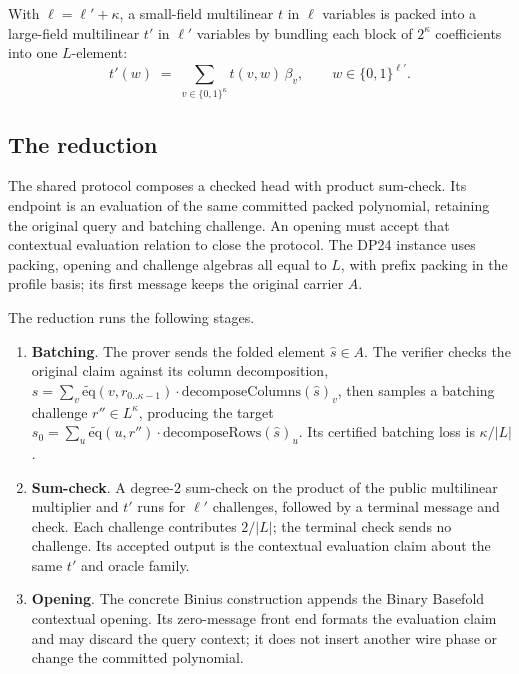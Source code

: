\begin{definition}
  \leanok
  \label{def:pack_mle}
  With $\ell = \ell' + \kappa$, a small-field multilinear $t$ in $\ell$ variables is packed into a
  large-field multilinear $t'$ in $\ell'$ variables by bundling each block of $2^\kappa$ coefficients
  into one $L$-element:
  \[
    t'(w) \;=\; \sum_{v \in \{0,1\}^\kappa} t(v, w)\,\beta_v, \qquad w \in \{0,1\}^{\ell'}.
  \]
\end{definition}

\subsection{The reduction}

The shared protocol composes a checked head with product sum-check. Its endpoint is an evaluation
of the same committed packed polynomial, retaining the original query and batching challenge.
An opening must accept that contextual evaluation relation to close the protocol. The DP24
instance uses packing, opening and challenge algebras all equal to $L$, with prefix packing in
the profile basis; its first message keeps the original carrier $A$.

\begin{definition}
  \label{def:ring_switching_stages}
  \leanok
  The reduction runs the following stages.
\begin{enumerate}
  \item \textbf{Batching}. The prover sends the folded element
    $\hat s \in A$. The verifier checks the original claim against its column decomposition,
    $s = \sum_v \tilde{\mathrm{eq}}(v, r_{0..\kappa-1})\cdot
    \mathrm{decomposeColumns}(\hat s)_v$, then samples a batching challenge $r'' \in L^\kappa$,
    producing the target $s_0 = \sum_u \tilde{\mathrm{eq}}(u, r'')\cdot
    \mathrm{decomposeRows}(\hat s)_u$. Its certified batching loss is
    $\kappa/\lvert L\rvert$.
  \item \textbf{Sum-check}. A degree-$2$
    sum-check on the product of the public multilinear multiplier and $t'$ runs for $\ell'$
    challenges, followed by a terminal message and check. Each challenge contributes
    $2/\lvert L\rvert$; the terminal check sends no challenge. Its accepted output is the
    contextual evaluation claim about the same $t'$ and oracle family.
  \item \textbf{Opening}. The concrete Binius construction appends the Binary Basefold contextual
    opening. Its zero-message front end formats the evaluation claim and may discard the
    query context; it does not insert another wire phase or change the committed polynomial.
\end{enumerate}
\end{definition}

